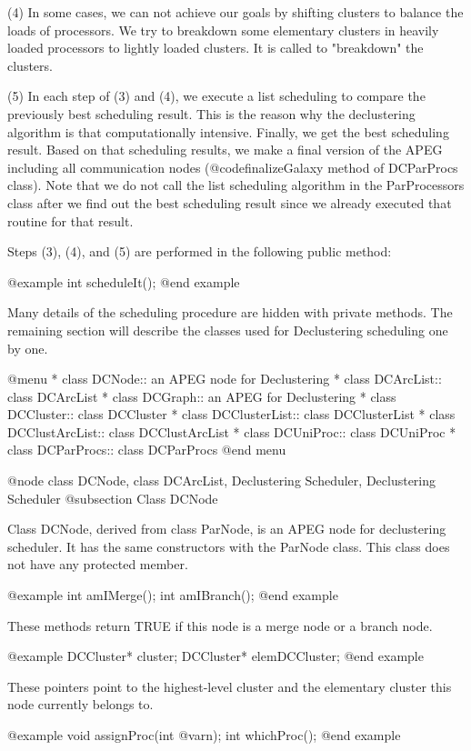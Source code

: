 (4) In some cases, we can not achieve our goals by shifting clusters to
balance the loads of processors. We try to breakdown some elementary
clusters in heavily loaded processors to lightly loaded clusters. It is
called to "breakdown" the clusters.

(5) In each step of (3) and (4), we execute a list scheduling to compare the
previously best scheduling result. This is the reason why the declustering
algorithm is that computationally intensive. Finally, we get the
best scheduling result. Based on that scheduling results, we make
a final version of the APEG  including all communication nodes 
(@code{finalizeGalaxy} method of DCParProcs class). Note that we do not
call the list scheduling algorithm in the ParProcessors class after we find
out the best scheduling result since we already executed that routine for
that result.

Steps (3), (4), and (5) are performed in the following public method:

@example
int scheduleIt();
@end example

Many details of the scheduling procedure are hidden with private methods.
The remaining section will describe the classes used for Declustering
scheduling one by one.

@menu
* class DCNode::			an APEG node for Declustering
* class DCArcList::			class DCArcList
* class DCGraph::			an APEG for Declustering
* class DCCluster::			class DCCluster
* class DCClusterList::			class DCClusterList
* class DCClustArcList::		class DCClustArcList
* class DCUniProc::			class DCUniProc
* class DCParProcs::			class DCParProcs
@end menu

@node class DCNode, class DCArcList, Declustering Scheduler, Declustering Scheduler
@subsection Class DCNode

Class DCNode, derived from class ParNode, is an APEG node for declustering
scheduler. It has the same constructors with the ParNode class.
This class does not have any protected member.

@example
int amIMerge();
int amIBranch();
@end example

These methods return TRUE if this node is a merge node or a branch node.

@example
DCCluster* cluster;
DCCluster* elemDCCluster;
@end example

These pointers point to the highest-level cluster and the elementary
cluster this node currently belongs to.

@example
void assignProc(int @var{n});
int whichProc();
@end example

